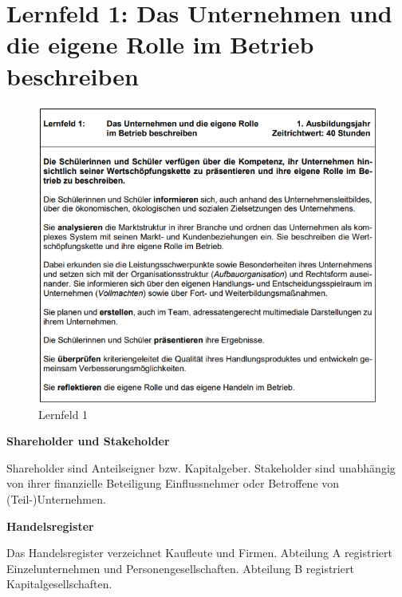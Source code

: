 \section{Lernfeld 1: Das Unternehmen und die eigene Rolle im Betrieb beschreiben}

\begin{figure}[H]
    \centering
    \includegraphics[width=\textwidth]{figures/lernfeld1.png}
    \caption{Lernfeld 1}
    \label{fig:lernfeld1}
\end{figure}
\FloatBarrier





\textbf{Shareholder und Stakeholder}

Shareholder sind Anteilseigner bzw. Kapitalgeber. Stakeholder sind unabhängig von ihrer finanzielle Beteiligung Einflussnehmer oder Betroffene von (Teil-)Unternehmen.





\textbf{Handelsregister}

Das Handelsregister verzeichnet Kaufleute und Firmen. Abteilung A registriert Einzelunternehmen und Personengesellschaften. Abteilung B registriert Kapitalgesellschaften.



